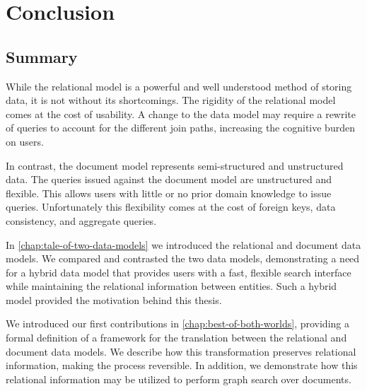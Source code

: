 \chapter{Conclusion}
\label{chap:conclusion}

% 	 	
% 	 	

	\section{Summary}
		While the relational model is a powerful and well understood method of storing data, it is not without its shortcomings.  The rigidity of the relational model comes at the cost of usability.  A change to the data model may require a rewrite of queries to account for the different join paths, increasing the cognitive burden on users.
		
		In contrast, the document model represents semi-structured and unstructured data.  The queries issued against the document model are unstructured and flexible.  This allows users with little or no prior domain knowledge to issue queries.  Unfortunately this flexibility comes at the cost of foreign keys, data consistency, and aggregate queries.
		
		In \cref{chap:tale-of-two-data-models} we introduced the relational and document data models.  We compared and contrasted the two data models, demonstrating a need for a hybrid data model that provides users with a fast, flexible search interface while maintaining the relational information between entities.  Such a hybrid model provided the motivation behind this thesis.
		
		We introduced our first contributions in \cref{chap:best-of-both-worlds}, providing a formal definition of a framework for the translation between the relational and document data models.  We describe how this transformation preserves relational information, making the process reversible.  In addition, we demonstrate how this relational information may be utilized to perform graph search over documents.
		
